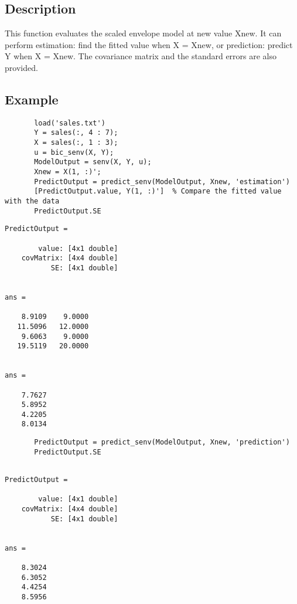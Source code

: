 \documentclass[a4paper,11pt,openany]{memoir}
\begin{document}
\subsection*{Description}

\begin{par}
This function evaluates the scaled envelope model at new value Xnew.  It can perform estimation: find the fitted value when X = Xnew, or prediction: predict Y when X = Xnew.  The covariance matrix and the standard errors are also provided.
\end{par} \vspace{1em}


\subsection*{Example}


\begin{verbatim}       load('sales.txt')
       Y = sales(:, 4 : 7);
       X = sales(:, 1 : 3);
       u = bic_senv(X, Y);
       ModelOutput = senv(X, Y, u);
       Xnew = X(1, :)';
       PredictOutput = predict_senv(ModelOutput, Xnew, 'estimation')
       [PredictOutput.value, Y(1, :)']  % Compare the fitted value with the data
       PredictOutput.SE\end{verbatim}    
        \color{lightgray}\ttfamily \begin{verbatim}
PredictOutput = 

        value: [4x1 double]
    covMatrix: [4x4 double]
           SE: [4x1 double]


ans =

    8.9109    9.0000
   11.5096   12.0000
    9.6063    9.0000
   19.5119   20.0000


ans =

    7.7627
    5.8952
    4.2205
    8.0134
\end{verbatim} \rmfamily
\color{black}       
       \begin{verbatim}
       PredictOutput = predict_senv(ModelOutput, Xnew, 'prediction')
       PredictOutput.SE\end{verbatim}
        \color{lightgray}\ttfamily \begin{verbatim}

PredictOutput = 

        value: [4x1 double]
    covMatrix: [4x4 double]
           SE: [4x1 double]


ans =

    8.3024
    6.3052
    4.4254
    8.5956

\end{verbatim} \rmfamily
\color{black}
    
\end{document}
